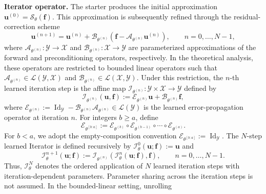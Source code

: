 \documentclass[preprint,numbers,sort&compress]{elsarticle}
\begin{document}
		\textbf{Iterator operator.}
		The starter produces the initial approximation $\boldsymbol u^{(0)}=\mathcal S_\theta(\boldsymbol f)$. This approximation is subsequently refined through the residual-correction scheme
		\begin{equation}
			\label{eq:learned_iteration}
			\boldsymbol u^{(n+1)}
			=
			\boldsymbol u^{(n)}
			+
			\mathcal B_{\theta^{(n)}}\left(
			\boldsymbol f
			-
			\mathcal A_{\theta^{(n)}}\boldsymbol u^{(n)}
			\right),
			\qquad
			n=0,\ldots,N-1,
		\end{equation}
		where $\mathcal A_{\theta^{(n)}}:\mathcal Y\to\mathcal X$ and $\mathcal B_{\theta^{(n)}}:\mathcal X\to\mathcal Y$ are parameterized approximations of the forward and preconditioning operators, respectively. In the theoretical analysis, these operators are restricted to bounded linear operators such that $\mathcal A_{\theta^{(n)}}
		\in\mathcal L(\mathcal Y,\mathcal X)$ and $\mathcal B_{\theta^{(n)}}
		\in\mathcal L(\mathcal X,\mathcal Y)$. 
		Under this restriction, the $n$-th learned iteration step is the affine map $\mathcal I_{\theta^{(n)}}:
		\mathcal Y\times\mathcal X\to\mathcal Y$ defined by
		\begin{equation}
			\label{eq:learned_iterator_step}
			\mathcal I_{\theta^{(n)}}(\boldsymbol u,\boldsymbol f)
			:=
			\mathcal E_{\theta^{(n)}}\boldsymbol u
			+
			\mathcal B_{\theta^{(n)}}\boldsymbol f,
		\end{equation}
		where $\mathcal E_{\theta^{(n)}}
		:=\operatorname{Id}_{\mathcal Y}-
		\mathcal B_{\theta^{(n)}}\mathcal A_{\theta^{(n)}}
		\in\mathcal L(\mathcal Y)$ is the learned error-propagation operator at iteration $n$. For integers $b\geq a$, define
		\[
		\mathcal E_{\theta^{[b:a]}}
		:=
		\mathcal E_{\theta^{(b)}}
		\circ
		\mathcal E_{\theta^{(b-1)}}
		\circ\cdots\circ
		\mathcal E_{\theta^{(a)}}.
		\]
		For $b<a$, we adopt the empty-composition convention $\mathcal E_{\theta^{[b:a]}}:=\operatorname{Id}_{\mathcal Y}$. The $N$-step learned Iterator is defined recursively by
		$\mathcal I_\theta^0(\boldsymbol u;\boldsymbol f)
		:=\boldsymbol u$ and 
		\begin{equation}
			\label{eq:multi_step_learnable_iterator}
			\mathcal I_\theta^{n+1}(\boldsymbol u;\boldsymbol f)
			:=
			\mathcal I_{\theta^{(n)}}\left(
			\mathcal I_\theta^n(\boldsymbol u;\boldsymbol f),
			\boldsymbol f
			\right),
			\qquad
			n=0,\ldots,N-1.
		\end{equation}
		Thus, $\mathcal I_\theta^N$ denotes the ordered application of $N$ learned iteration steps with iteration-dependent parameters. Parameter sharing across the iteration steps is not assumed.  In the bounded-linear setting, unrolling
\end{document}
